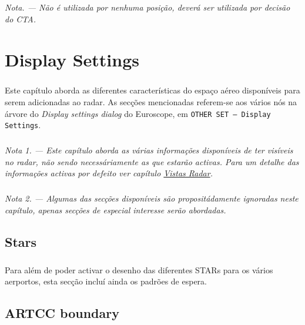 \documentclass[10pt]{report}
\begin{document}
\paragraph*{} \textit{Nota. — Não é utilizada por nenhuma posição, deverá ser utilizada por decisão do CTA.}

\chapter{Display Settings}

\paragraph*{} Este capítulo aborda as diferentes características do espaço aéreo disponíveis para
serem adicionadas ao radar. As secções mencionadas referem-se aos vários nós na árvore do
\textit{Display settings dialog} do Euroscope, em \texttt{OTHER SET – Display Settings}.

\paragraph*{} \textit{Nota 1. — Este capítulo aborda as várias informações disponíveis de ter
visíveis no radar, não sendo necessáriamente as que estarão activas. Para um detalhe das
informações activas por defeito ver capítulo \hyperref[cap:vistas]{Vistas Radar}.}

\paragraph*{} \textit{Nota 2. — Algumas das secções disponíveis são propositádamente ignoradas
neste capítulo, apenas secções de especial interesse serão abordadas.}

\section{Stars}

\paragraph*{} Para além de poder activar o desenho das diferentes STARs para os vários aerportos,
esta secção incluí ainda os padrões de espera.

\section{ARTCC boundary}
\end{document}
